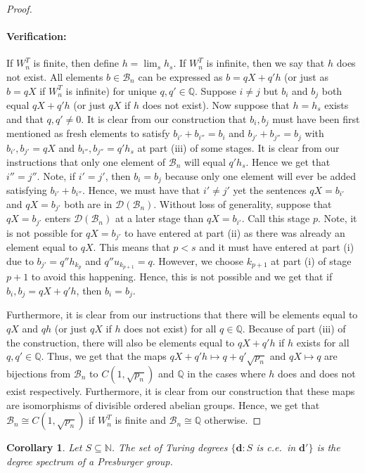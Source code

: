 \documentclass{amsart}%
\numberwithin{theorem}{section}
\newtheorem{corollary}[theorem]{Corollary}
\newcommand{\Q}{\mathbb{Q}}
\newcommand{\N}{\mathbb{N}}
\newcommand{\B}{\mathcal{B}}
\newcommand{\D}{\mathcal{D}}
\newcommand{\0}{\emptyset}
\newcommand{\ddd}{\boldsymbol{d}}
\begin{document}
\begin{proof}
\paragraph{Verification:} If $W_n^T$ is finite, then define $h=\lim_s h_s$. If $W_n^T$ is infinite, then we say that $h$ does not exist. All elements $b\in \B_n$ can be expressed as $b=qX + q'h$ (or just as $b=qX$ if $W_n^T$ is infinite) for unique $q,q'\in \Q$. Suppose $i\neq j$ but $b_i$ and $b_j$ both equal $qX + q'h$ (or just $qX$ if $h$ does not exist). Now suppose that $h=h_s$ exists and that $q,q'\neq 0$. It is clear from our construction that $b_i,b_j$ must have been first mentioned as fresh elements to satisfy $b_{i'}+b_{i''}=b_i$ and $b_{j'} + b_{j''}=b_j$ with $b_{i'},b_{j'}=qX$ and $b_{i''},b_{j''}= q'h_s$ at part (iii) of some stages. It is clear from our instructions that only one element of $\B_n$ will equal $q'h_s$. Hence we get that $i''=j''$. Note, if $i'=j'$, then $b_i=b_j$ because only one element will ever be added satisfying $b_{i'}+ b_{i''}$. Hence, we must have that $i'\neq j'$ yet the sentences $qX=b_{i'}$ and $qX=b_{j'}$ both are in $\D(\B_n)$. Without loss of generality, suppose that $qX=b_{j'}$ enters $\D(\B_n)$ at a later stage than $qX=b_{i'}$. Call this stage $p$. Note, it is not possible for $qX=b_{j'}$ to have entered at part (ii) as there was already an element equal to $qX$. This means that $p<s$ and it must have entered at part (i) due to $b_{j'}=q''h_{k_p}$ and $q''u_{k_{p+1}}=q$. However, we choose $k_{p+1}$ at part (i) of stage $p+1$ to avoid this happening. Hence, this is not possible and we get that if $b_i,b_j=qX + q'h$, then $b_i=b_j$.

Furthermore, it is clear from our instructions that there will be elements equal to $qX$ and $qh$ (or just $qX$ if $h$ does not exist) for all $q\in \Q$. Because of part (iii) of the construction, there will also be elements equal to $qX + q'h$ if $h$ exists for all $q,q'\in \Q$. Thus, we get that the maps $qX + q'h \mapsto q + q'\sqrt{p_n} $ and $qX\mapsto q$ are bijections from $\B_n$ to $C(1,\sqrt{p_n})$ and $\Q$  in the cases where $h$ does and does not exist respectively. Furthermore, it is clear from our construction that these maps are isomorphisms of divisible ordered abelian groups. Hence, we get that $\B_n\cong C(1,\sqrt{p_n})$ if $W^T_n$ is finite and $\B_n\cong \Q$ otherwise. 
\end{proof} 

\begin{corollary}
\label{degree cor 1}
    Let $S\subseteq \N$. The set of Turing degrees $\{\ddd: S$ is c.e.\ in $\ddd'\}$ is the degree spectrum of a Presburger group.
\end{corollary}
\end{document}
